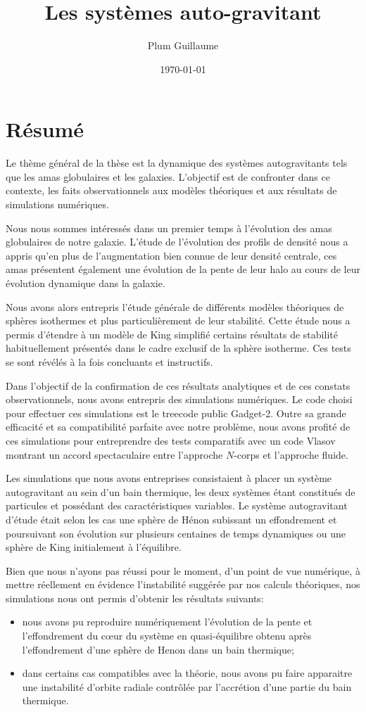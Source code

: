 \documentclass[a4paper,11pt,twoside,openright]{report}
\title{Les systèmes auto-gravitant}
\author{Plum Guillaume}
\date{\today}
\renewcommand{\(}{\ensuremath{\left(}}
\renewcommand{\)}{\ensuremath{\right)}}
\begin{document}
	\dominitoc
	

	\cleardoublepage

	\chapter*{Résumé}
		Le thème général de la thèse est la dynamique des
		systèmes autogravitants tels que les amas globulaires et les galaxies.
		L'objectif est de confronter dans ce contexte, les faits observationnels aux
		modèles théoriques et aux résultats de simulations numériques.
		
		Nous nous sommes intéressés dans un premier temps à l'évolution des
		amas globulaires de notre galaxie. L'étude de l'évolution des profils de
		densité nous a appris
		qu'en plus de l'augmentation bien connue de leur densité centrale, ces
		amas présentent également une évolution de la pente de leur halo au
		cours de leur évolution dynamique dans la galaxie.

		Nous avons alors entrepris l'étude générale de différents modèles
		théoriques de sphères isothermes et plus particulièrement de leur
		stabilité. Cette étude nous a permis d'étendre à un modèle de King
		simplifié certains résultats de stabilité habituellement présentés dans
		le cadre exclusif de la sphère isotherme. Ces tests se sont révélés à
		la fois concluants et instructifs.

		Dans l'objectif de la confirmation de ces résultats analytiques et de ces
		constats observationnels, nous avons entrepris des simulations numériques. Le
		code choisi pour effectuer ces simulations est le treecode public Gadget-2.
		Outre sa grande efficacité et sa compatibilité parfaite avec notre problème,
		nous avons profité de ces simulations pour entreprendre des tests comparatifs
		avec un code Vlasov montrant un accord spectaculaire entre l'approche $N$-corps et l'approche fluide.

		Les simulations que nous avons entreprises consistaient à placer un système
		autogravitant au sein d'un bain thermique, les deux systèmes étant constitués
		de particules et possédant des caractéristiques variables. Le système
		autogravitant d'étude était selon les cas une sphère de Hénon subissant un
		effondrement et poursuivant son évolution sur plusieurs centaines de temps
		dynamiques ou une sphère de King initialement à l'équilibre.

		Bien que nous n'ayons pas réussi pour le moment, d'un point de vue numérique, à mettre réellement en évidence l'instabilité
		suggérée par nos calculs théoriques, nos simulations nous ont permis d'obtenir les résultats suivants:
		\begin{itemize}
			\item nous avons pu reproduire numériquement l'évolution de la pente et l'effondrement du c\oe ur du système en quasi-équilibre obtenu après l'effondrement d'une sphère de Henon dans un bain thermique;
			\item dans certains cas compatibles avec la théorie, nous avons pu faire apparaitre une instabilité d'orbite radiale contrôlée par l'accrétion d'une partie du bain thermique.
		\end{itemize}
\end{document}
